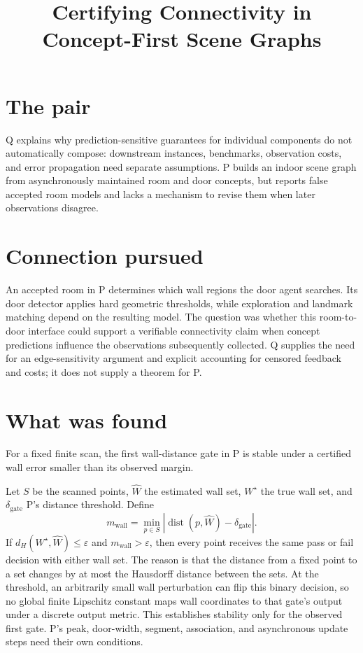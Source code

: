 \documentclass{article}
\title{Certifying Connectivity in Concept-First Scene Graphs}
\begin{document}
\maketitle

\section*{The pair}

Q explains why prediction-sensitive guarantees for individual components do not automatically compose: downstream instances, benchmarks, observation costs, and error propagation need separate assumptions. P builds an indoor scene graph from asynchronously maintained room and door concepts, but reports false accepted room models and lacks a mechanism to revise them when later observations disagree. 

\section*{Connection pursued}

An accepted room in P determines which wall regions the door agent searches. Its door detector applies hard geometric thresholds, while exploration and landmark matching depend on the resulting model. The question was whether this room-to-door interface could support a verifiable connectivity claim when concept predictions influence the observations subsequently collected. Q supplies the need for an edge-sensitivity argument and explicit accounting for censored feedback and costs; it does not supply a theorem for P. 

\section*{What was found}

\begin{claim}
For a fixed finite scan, the first wall-distance gate in P is stable under a certified wall error smaller than its observed margin.
\end{claim}

Let \(S\) be the scanned points, \(\widehat W\) the estimated wall set, \(W^\star\) the true wall set, and \(\delta_{\mathrm{gate}}\) P's distance threshold. Define
\[
m_{\mathrm{wall}}
=\min_{p\in S}
\left|\operatorname{dist}(p,\widehat W)-\delta_{\mathrm{gate}}\right|.
\]
If \(d_H(W^\star,\widehat W)\leq\varepsilon\) and \(m_{\mathrm{wall}}>\varepsilon\), then every point receives the same pass or fail decision with either wall set. The reason is that the distance from a fixed point to a set changes by at most the Hausdorff distance between the sets. At the threshold, an arbitrarily small wall perturbation can flip this binary decision, so no global finite Lipschitz constant maps wall coordinates to that gate's output under a discrete output metric. This establishes stability only for the observed first gate. P's peak, door-width, segment, association, and asynchronous update steps need their own conditions. 
\end{document}
